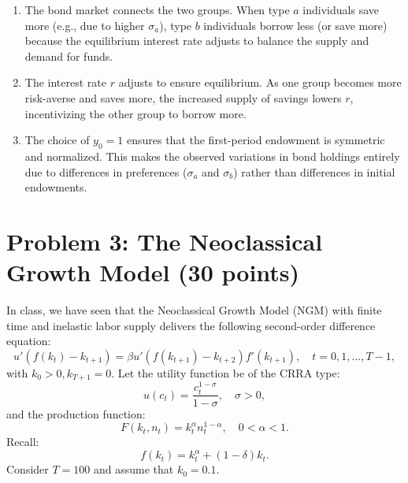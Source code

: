 \documentclass[12pt]{article}
\begin{document}
\begin{enumerate}
\begin{enumerate}
 \item%
    The bond market connects the two groups. When type \(a\) individuals save more (e.g., due to higher \(\sigma_a\)), type \(b\) individuals borrow less (or save more) because the equilibrium interest rate adjusts to balance the supply and demand for funds.
 \item%
    The interest rate \(r\) adjusts to ensure equilibrium. As one group becomes more risk-averse and saves more, the increased supply of savings lowers \(r\), incentivizing the other group to borrow more.

 \item %
    The choice of \(y_0 = 1\) ensures that the first-period endowment is symmetric and normalized. This makes the observed variations in bond holdings entirely due to differences in preferences (\(\sigma_a\) and \(\sigma_b\)) rather than differences in initial endowments.
\end{enumerate}


\end{enumerate}

\section*{Problem 3: The Neoclassical Growth Model (30 points)}

In class, we have seen that the Neoclassical Growth Model (NGM) with finite time and inelastic labor supply delivers the following second-order difference equation:
\[
u'(f(k_t) - k_{t+1}) = \beta u'(f(k_{t+1}) - k_{t+2}) f'(k_{t+1}), \quad t = 0, 1, \ldots, T-1,
\]
with \(k_0 > 0, k_{T+1} = 0\). Let the utility function be of the CRRA type:
\[
u(c_t) = \frac{c_t^{1-\sigma}}{1-\sigma}, \quad \sigma > 0,
\]
and the production function:
\[
F(k_t, n_t) = k_t^\alpha n_t^{1-\alpha}, \quad 0 < \alpha < 1.
\]
Recall:
\[
f(k_t) = k_t^\alpha + (1-\delta)k_t.
\]
Consider \(T = 100\) and assume that \(k_0 = 0.1\).
\end{document}
